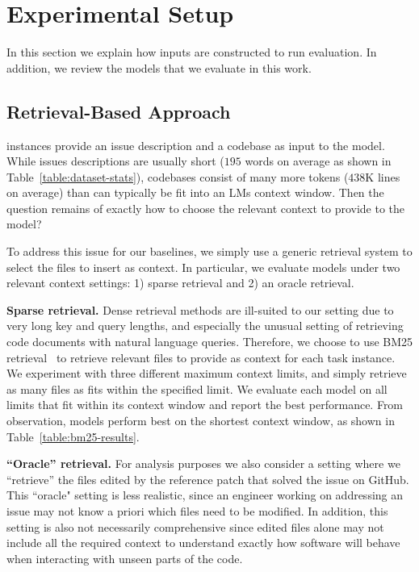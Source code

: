 \section{Experimental Setup}
\label{sec:experimental-setup}
In this section we explain how inputs are constructed to run \benchmark{} evaluation.
In addition, we review the models that we evaluate in this work.

\subsection{Retrieval-Based Approach}
\label{sec:experimental-setup:input-formulation}
\benchmark{} instances provide an issue description and a codebase as input to the model.
While issues descriptions are usually short ($195$ words on average as shown in Table~\ref{table:dataset-stats}), codebases consist of many more tokens ($438$K lines on average) than can typically be fit into an LMs context window.
Then the question remains of exactly how to choose the relevant context to provide to the model?

To address this issue for our baselines, we simply use a generic retrieval system to select the files to insert as context.
In particular, we evaluate models under two relevant context settings: 1) sparse retrieval and 2) an oracle retrieval.

\textbf{Sparse retrieval.}
Dense retrieval methods are ill-suited to our setting due to very long key and query lengths, and especially the unusual setting of retrieving code documents with natural language queries.
Therefore, we choose to use BM25 retrieval~\citep{robertson2009probabilistic} to retrieve relevant files to provide as context for each task instance.
We experiment with three different maximum context limits, and simply retrieve as many files as fits within the specified limit.
We evaluate each model on all limits that fit within its context window and report the best performance.
From observation, models perform best on the shortest context window, as shown in Table~\ref{table:bm25-results}.

\textbf{``Oracle'' retrieval.}
For analysis purposes we also consider a setting where we ``retrieve'' the files edited by the reference patch that solved the issue on GitHub.
This ``oracle" setting is less realistic, since an engineer working on addressing an issue may not know a priori which files need to be modified.
In addition, this setting is also not necessarily comprehensive since edited files alone may not include all the required context to understand exactly how software will behave when interacting with unseen parts of the code.

